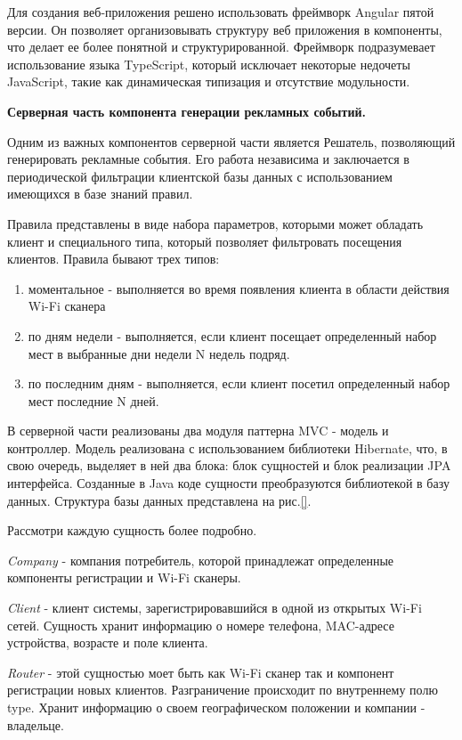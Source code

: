 Для создания веб-приложения решено использовать фреймворк Angular пятой версии. Он позволяет организовывать структуру веб приложения в компоненты, что делает ее более понятной и структурированной. Фреймворк подразумевает использование языка TypeScript, который исключает некоторые недочеты JavaScript, такие как динамическая типизация и отсутствие модульности.

\textbf{Серверная часть компонента генерации рекламных событий.}

Одним из важных компонентов серверной части является Решатель, позволяющий генерировать рекламные события. Его работа независима и заключается в периодической фильтрации клиентской базы данных с использованием имеющихся в базе знаний правил. 

Правила представлены в виде набора параметров, которыми может обладать клиент и специального типа, который позволяет фильтровать посещения клиентов. Правила бывают трех типов:

\begin{enumerate}
	\item моментальное - выполняется во время появления клиента в области действия Wi-Fi сканера
	\item по дням недели - выполняется, если клиент посещает определенный набор мест в выбранные дни недели N недель подряд.
	\item по последним дням - выполняется, если клиент посетил определенный набор мест последние N дней.
\end{enumerate}

В серверной части реализованы два модуля паттерна MVC - модель и контроллер. Модель реализована с использованием библиотеки Hibernate, что, в свою очередь, выделяет в ней два блока: блок сущностей и блок реализации JPA интерфейса. Созданные в Java коде сущности преобразуются библиотекой в базу данных. Структура базы данных представлена на рис.\ref{}.

Рассмотри каждую сущность более подробно.

\textit{Company} - компания потребитель, которой принадлежат определенные компоненты регистрации и Wi-Fi сканеры.  

\textit{Client} - клиент системы, зарегистрировавшийся в одной из открытых Wi-Fi сетей. Сущность хранит информацию о номере телефона, MAC-адресе устройства, возрасте  и поле клиента.

\textit{Router} - этой сущностью моет быть как Wi-Fi сканер так и компонент регистрации новых клиентов. Разграничение происходит по внутреннему полю type. Хранит информацию о своем географическом положении и компании - владельце.

